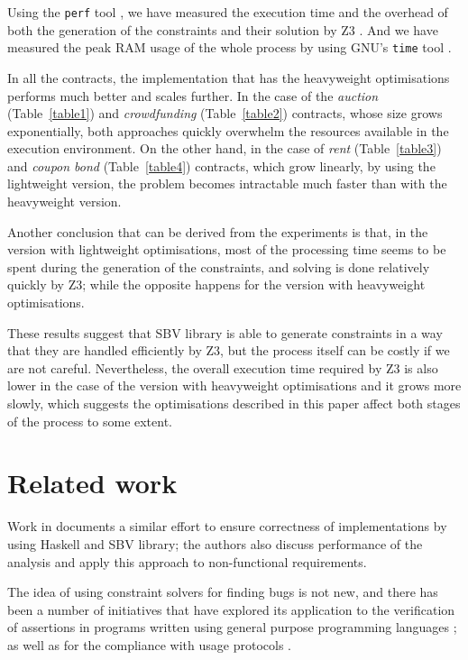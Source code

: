 \documentclass[english,runningheads]{llncs}
\begin{document}
Using the \texttt{perf} tool \cite{perf}, we have measured the execution time
and the overhead of both the generation of the constraints and their solution
by Z3 \cite{de2008z3}. And we have measured the peak RAM usage of the whole
process by using GNU's \texttt{time} tool \cite{keppel1998gnu}.

In all the contracts, the implementation that has the heavyweight optimisations
performs much better and scales further. In the case of the \textit{auction}
(Table~\ref{table1}) and \textit{crowdfunding} (Table~\ref{table2}) contracts,
whose size grows exponentially, both approaches quickly overwhelm the resources
available in the execution environment. On the other hand, in the case of \textit{rent}
(Table~\ref{table3}) and \textit{coupon bond} (Table~\ref{table4}) contracts, which grow
linearly, by using the lightweight version, the problem becomes intractable much
faster than with the heavyweight version.

Another conclusion that can be derived from the experiments is that, in the
version with lightweight optimisations, most of the processing time seems to be
spent during the generation of the constraints, and solving is done relatively
quickly by Z3; while the opposite happens for the version with heavyweight
optimisations.

These results suggest that SBV library is able to generate constraints in a way
that they are handled efficiently by Z3, but the process itself can be costly
if we are not careful. Nevertheless, the overall execution time required by Z3
is also lower in the case of the version with heavyweight optimisations and it
grows more slowly, which suggests the optimisations described in this paper
affect both stages of the process to some extent.

\section{Related work}

Work in \cite{mokhov2019formal} documents a similar effort to ensure
correctness of implementations by using Haskell and SBV library; the
authors also discuss performance of the analysis and apply this approach
to non-functional requirements.

The idea of using constraint solvers for finding bugs is not new,
and there has been a number of initiatives that have explored its
application to the verification of assertions in programs written
using general purpose programming languages \cite{gulwani2008program,jackson2000finding};
as well as for the compliance with usage protocols
\cite{ball2001automatically,xie2005saturn}.
\end{document}
